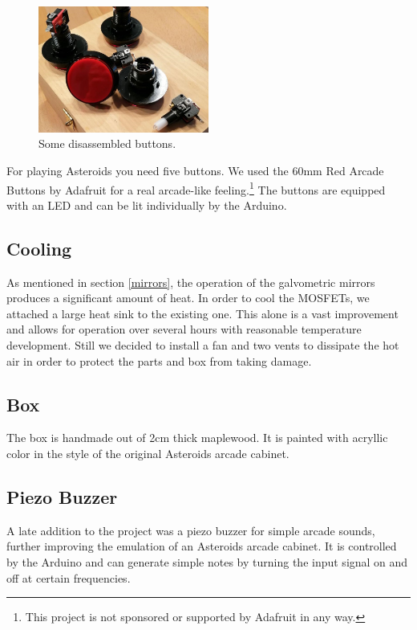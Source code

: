 \documentclass{report}
\begin{document}
\begin{figure}[h]
	\centering
	\includegraphics[width=0.5\textwidth]{buttons.jpg}
	\caption{Some disassembled buttons.}
	\label{img:buttons}
\end{figure}

For playing Asteroids you need five buttons. We used the 60mm Red Arcade Buttons by Adafruit for a real arcade-like feeling.\footnote{This project is not sponsored or supported by Adafruit in any way.} The buttons are equipped with an LED and can be lit individually by the Arduino.

\subsection{Cooling}

As mentioned in section \ref{mirrors}, the operation of the galvometric mirrors produces a significant amount of heat. In order to cool the MOSFETs, we attached a large heat sink to the existing one. This alone is a vast improvement and allows for operation over several hours with reasonable temperature development. Still we decided to install a fan and two vents to dissipate the hot air in order to protect the parts and box from taking damage.

\subsection{Box}

The box is handmade out of 2cm thick maplewood. It is painted with acryllic color in the style of the original Asteroids arcade cabinet.

\subsection{Piezo Buzzer}

A late addition to the project was a piezo buzzer for simple arcade sounds, further improving the emulation of an Asteroids arcade cabinet. It is controlled by the Arduino and can generate simple notes by turning the input signal on and off at certain frequencies.
\end{document}

